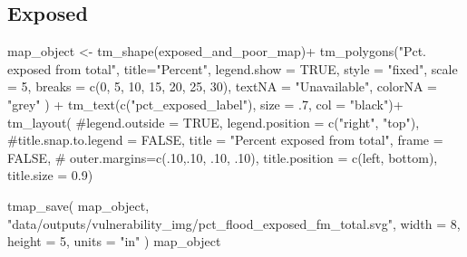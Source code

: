 \documentclass[
  letterpaper,
  DIV=11,
  numbers=noendperiod]{scrartcl}
\newenvironment{Shaded}{}{}
\newcommand{\AttributeTok}[1]{\textcolor[rgb]{0.84,0.23,0.29}{#1}}
\newcommand{\CommentTok}[1]{\textcolor[rgb]{0.42,0.45,0.49}{#1}}
\newcommand{\ConstantTok}[1]{\textcolor[rgb]{0.00,0.36,0.77}{#1}}
\newcommand{\DecValTok}[1]{\textcolor[rgb]{0.00,0.36,0.77}{#1}}
\newcommand{\FloatTok}[1]{\textcolor[rgb]{0.00,0.36,0.77}{#1}}
\newcommand{\FunctionTok}[1]{\textcolor[rgb]{0.44,0.26,0.76}{#1}}
\newcommand{\NormalTok}[1]{\textcolor[rgb]{0.14,0.16,0.18}{#1}}
\newcommand{\OtherTok}[1]{\textcolor[rgb]{0.44,0.26,0.76}{#1}}
\newcommand{\SpecialCharTok}[1]{\textcolor[rgb]{0.00,0.36,0.77}{#1}}
\newcommand{\StringTok}[1]{\textcolor[rgb]{0.01,0.18,0.38}{#1}}
\begin{document}
\subsection{Exposed}\label{exposed}

\begin{Shaded}
\begin{Highlighting}[]
\NormalTok{map\_object }\OtherTok{\textless{}{-}}
\FunctionTok{tm\_shape}\NormalTok{(exposed\_and\_poor\_map)}\SpecialCharTok{+}
  \FunctionTok{tm\_polygons}\NormalTok{(}\StringTok{"Pct. exposed from total"}\NormalTok{,}
              \AttributeTok{title=}\StringTok{"Percent"}\NormalTok{, }
              \AttributeTok{legend.show =} \ConstantTok{TRUE}\NormalTok{,}
              \AttributeTok{style =} \StringTok{"fixed"}\NormalTok{,}
              \AttributeTok{scale =} \DecValTok{5}\NormalTok{,}
              \AttributeTok{breaks =} \FunctionTok{c}\NormalTok{(}\DecValTok{0}\NormalTok{, }\DecValTok{5}\NormalTok{, }\DecValTok{10}\NormalTok{, }\DecValTok{15}\NormalTok{, }\DecValTok{20}\NormalTok{, }\DecValTok{25}\NormalTok{, }\DecValTok{30}\NormalTok{),}
              \AttributeTok{textNA =} \StringTok{"Unavailable"}\NormalTok{,}
              \AttributeTok{colorNA =} \StringTok{"grey"}
\NormalTok{              ) }\SpecialCharTok{+}
  \FunctionTok{tm\_text}\NormalTok{(}\FunctionTok{c}\NormalTok{(}\StringTok{"pct\_exposed\_label"}\NormalTok{), }\AttributeTok{size =}\NormalTok{ .}\DecValTok{7}\NormalTok{, }\AttributeTok{col =} \StringTok{"black"}\NormalTok{)}\SpecialCharTok{+}
  \FunctionTok{tm\_layout}\NormalTok{(}
    \CommentTok{\#legend.outside = TRUE,}
    \AttributeTok{legend.position =} \FunctionTok{c}\NormalTok{(}\StringTok{"right"}\NormalTok{, }\StringTok{"top"}\NormalTok{),}
    \CommentTok{\#title.snap.to.legend = FALSE,}
    \AttributeTok{title =} 
      \StringTok{"Percent exposed from total"}\NormalTok{,}
    \AttributeTok{frame =} \ConstantTok{FALSE}\NormalTok{,}
\CommentTok{\#            outer.margins=c(.10,.10, .10, .10), }
            \AttributeTok{title.position =} \FunctionTok{c}\NormalTok{(}\StringTok{\textquotesingle{}left\textquotesingle{}}\NormalTok{, }\StringTok{\textquotesingle{}bottom\textquotesingle{}}\NormalTok{),}
            \AttributeTok{title.size =} \FloatTok{0.9}\NormalTok{)}

\FunctionTok{tmap\_save}\NormalTok{(}
\NormalTok{  map\_object,}
  \StringTok{"data/outputs/vulnerability\_img/pct\_flood\_exposed\_fm\_total.svg"}\NormalTok{,}
  \AttributeTok{width =} \DecValTok{8}\NormalTok{,}
  \AttributeTok{height =} \DecValTok{5}\NormalTok{,}
  \AttributeTok{units =} \StringTok{"in"}
\NormalTok{)}
\NormalTok{map\_object}
\end{Highlighting}
\end{Shaded}
\end{document}
